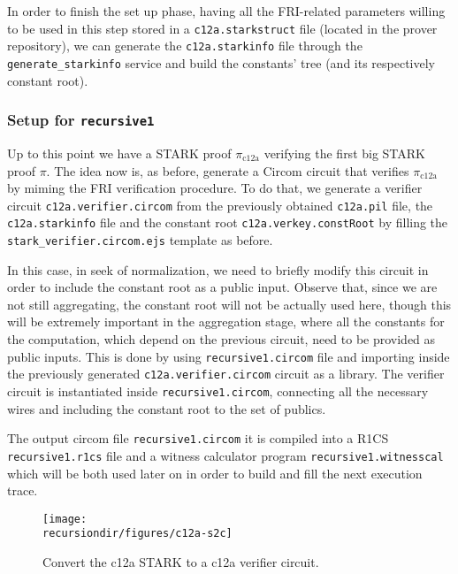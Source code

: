 In order to finish the set up phase, having all the FRI-related parameters willing to be used in this step stored in a \texttt{c12a.starkstruct} file (located in the prover repository), we can generate the \texttt{c12a.starkinfo} file through the \texttt{generate\_starkinfo} service and build the constants' tree (and its respectively constant root). 




\subsubsection{Setup \stoc for \texttt{recursive1}}

Up to this point we have a STARK proof $\pi_{\text{c12a}}$ verifying the first big STARK proof $\pi$. The idea now is, as before, generate a Circom circuit that verifies $\pi_{\text{c12a}}$ by miming the FRI verification procedure. To do that, we generate a verifier circuit \texttt{c12a.verifier.circom} from the previously obtained \texttt{c12a.pil} file, the \texttt{c12a.starkinfo} file and the constant root \texttt{c12a.verkey.constRoot} by filling the \texttt{stark\_verifier.circom.ejs} template as before.

In this case, in seek of normalization, we need to briefly modify this circuit in order to include the constant root as a public input. Observe that, since we are not still aggregating, the constant root will not be actually used here, though this will be extremely important in the aggregation stage, where all the constants for the computation, which depend on the previous circuit, need to be provided as public inputs. This is done by using \texttt{recursive1.circom} file and importing inside the previously generated \texttt{c12a.verifier.circom} circuit as a library. The verifier circuit is instantiated inside \texttt{recursive1.circom}, connecting all the necessary wires and including the constant root to the set of publics. 

The output circom file \texttt{recursive1.circom} it is compiled into a R1CS \texttt{recursive1.r1cs} file and a witness calculator program \texttt{recursive1.witnesscal} which will be both used later on in order to build and fill the next execution trace. 

\begin{figure}[H]
\centering
\texttt{[image: \\recursiondir/figures/c12a-s2c]}
\caption{Convert the c12a STARK to a c12a verifier circuit.}
\label{fig:c12a-s2c}
\end{figure}


